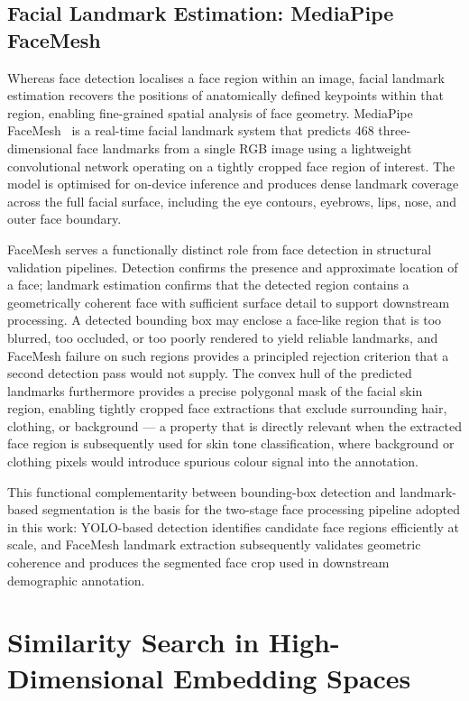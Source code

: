 \subsection{Facial Landmark Estimation: MediaPipe FaceMesh}

Whereas face detection localises a face region within an image, facial
landmark estimation recovers the positions of anatomically defined
keypoints within that region, enabling fine-grained spatial analysis of
face geometry. MediaPipe FaceMesh~\cite{Kartynnik_2019_FaceMesh} is a
real-time facial landmark system that predicts 468 three-dimensional face
landmarks from a single RGB image using a lightweight convolutional network
operating on a tightly cropped face region of interest. The model is
optimised for on-device inference and produces dense landmark coverage
across the full facial surface, including the eye contours, eyebrows, lips,
nose, and outer face boundary.

FaceMesh serves a functionally distinct role from face detection in
structural validation pipelines. Detection confirms the presence and
approximate location of a face; landmark estimation confirms that the
detected region contains a geometrically coherent face with sufficient
surface detail to support downstream processing. A detected bounding box
may enclose a face-like region that is too blurred, too occluded, or too
poorly rendered to yield reliable landmarks, and FaceMesh failure on such
regions provides a principled rejection criterion that a second detection
pass would not supply. The convex hull of the predicted landmarks
furthermore provides a precise polygonal mask of the facial skin region,
enabling tightly cropped face extractions that exclude surrounding hair,
clothing, or background --- a property that is directly relevant when the
extracted face region is subsequently used for skin tone classification,
where background or clothing pixels would introduce spurious colour signal
into the annotation.

This functional complementarity between bounding-box detection and
landmark-based segmentation is the basis for the two-stage face processing
pipeline adopted in this work: YOLO-based detection identifies candidate
face regions efficiently at scale, and FaceMesh landmark extraction
subsequently validates geometric coherence and produces the segmented face
crop used in downstream demographic annotation.

\section{Similarity Search in High-Dimensional Embedding Spaces}\label{subsec:faiss}

